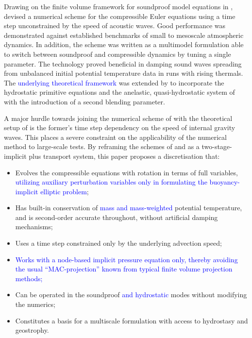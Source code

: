 \documentclass{ametsoc}
\theoremstyle{definition}
\newcommand{\klein}[1]{\textcolor{blue}{#1}}
\begin{document}
Drawing on the finite volume framework for soundproof model equations in \citep{KleinTCFD2009},  \citet{Benacchio2014, BenacchioEtAl2014} devised a numerical scheme for the compressible Euler equations using a time step unconstrained by the speed of acoustic waves. Good performance was demonstrated against established benchmarks of small to mesoscale atmospheric dynamics. In addition, the scheme was written as a multimodel formulation able to switch between soundproof and compressible dynamics by tuning a single parameter. The technology proved beneficial in damping sound waves spreading from unbalanced initial potential temperature data in runs with rising thermals. The  \klein{underlying theoretical framework} was extended by \citet{KleinBenacchio2016} to incorporate the hydrostatic primitive equations and the anelastic, quasi-hydrostatic system of \cite{ArakawaKonor2009} with the introduction of a second blending parameter.

A major hurdle towards joining the numerical scheme of \cite{BenacchioEtAl2014} with the theoretical setup of \cite{KleinBenacchio2016} is the former's time step dependency on the speed of internal gravity waves. This places a severe constraint on the applicability of the numerical method to large-scale tests. By reframing the schemes of \cite{KleinTCFD2009} and \cite{BenacchioEtAl2014} as a two-stage-implicit plus transport system, this paper proposes a discretisation that:
%
\begin{itemize}
\item Evolves the compressible equations with rotation in terms of full variables, \klein{utilizing auxiliary perturbation variables only in formulating the buoyancy-implicit elliptic problem};
\item Has built-in conservation of \klein{mass and mass-weighted} potential temperature, and is second-order accurate throughout, without artificial damping mechanisms;
\item Uses a time step constrained only by the underlying advection speed;
\item \klein{Works with a node-based implicit pressure equation only, thereby avoiding the usual ``MAC-projection'' known from typical finite volume projection methods;} 
\item Can be operated in the soundproof \klein{and hydrostatic} modes without modifying the numerics;
\item Constitutes a basis for a multiscale formulation with access to hydrostasy and geostrophy.
\end{itemize}
\end{document}
